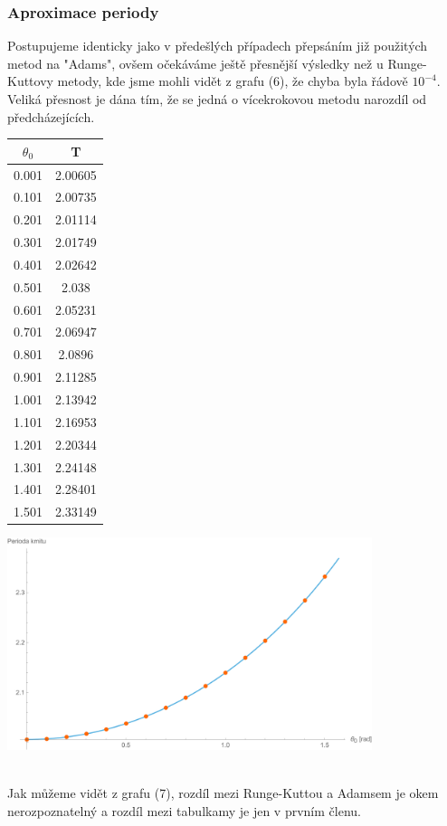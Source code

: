 \documentclass[reqno, a4paper]{amsart}
\begin{document}
				\subsubsection{Aproximace periody}
				Postupujeme identicky jako v předešlých případech přepsáním již použitých metod na "Adams", ovšem očekáváme ještě přesnější výsledky než u Runge-Kuttovy metody, kde jsme mohli vidět z grafu (6), že chyba byla řádově $10^{-4}$. Veliká přesnost je dána tím, že se jedná o vícekrokovou metodu narozdíl od předcházejících.
				\\
				\begin{minipage}{\textwidth}
					\begin{minipage}[b]{0.25\textwidth}
						\centering
						\begin{tabular}{|c|c|}
							\hline
							$\theta_{0}$ & T \\ 
							\hline
							0.001& 2.00605\\0.101& 2.00735\\0.201& 2.01114\\0.301& 2.01749\\0.401& 2.02642\\0.501& 2.038\\0.601& 2.05231\\0.701& 2.06947\\0.801& 2.0896\\0.901& 2.11285\\1.001& 2.13942
							\\1.101& 2.16953\\1.201& 2.20344\\1.301& 2.24148\\1.401& 2.28401\\1.501& 2.33149\\
							\hline
						\end{tabular}
					\end{minipage}
					\begin{minipage}[b]{0.79\textwidth}
						\centering
						\includegraphics[width=0.8\textwidth]{Runge - Kutta, Perioda}
					\end{minipage}
					\hfill
				\end{minipage}
				\\
				Jak můžeme vidět z grafu (7), rozdíl mezi Runge-Kuttou a Adamsem je okem nerozpoznatelný a rozdíl mezi tabulkamy je jen v prvním členu.
\end{document}
